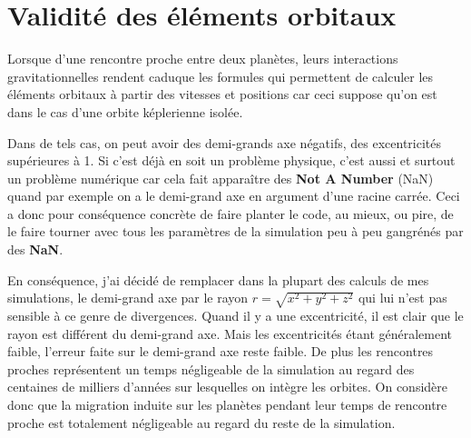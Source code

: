 \section{Validité des éléments orbitaux}
Lorsque d'une rencontre proche entre deux planètes, leurs interactions gravitationnelles rendent caduque les formules qui permettent de calculer les éléments orbitaux à partir des vitesses et positions car ceci suppose qu'on est dans le cas d'une orbite képlerienne isolée. 

Dans de tels cas, on peut avoir des demi-grands axe négatifs, des excentricités supérieures à 1. Si c'est déjà en soit un problème physique, c'est aussi et surtout un problème numérique car cela fait apparaître des \textbf{Not A Number} (NaN) quand par exemple on a le demi-grand axe en argument d'une racine carrée. Ceci a donc pour conséquence concrète de faire planter le code, au mieux, ou pire, de le faire tourner avec tous les paramètres de la simulation peu à peu gangrénés par des \textbf{NaN}. 

En conséquence, j'ai décidé de remplacer dans la plupart des calculs de mes simulations, le demi-grand axe par le rayon $r=\sqrt{x^2+y^2+z^2}$ qui lui n'est pas sensible à ce genre de divergences. Quand il y a une excentricité, il est clair que le rayon est différent du demi-grand axe. Mais les excentricités étant généralement faible, l'erreur faite sur le demi-grand axe reste faible. De plus les rencontres proches représentent un temps négligeable de la simulation au regard des centaines de milliers d'années sur lesquelles on intègre les orbites. On considère donc que la migration induite sur les planètes pendant leur temps de rencontre proche est totalement négligeable au regard du reste de la simulation.



